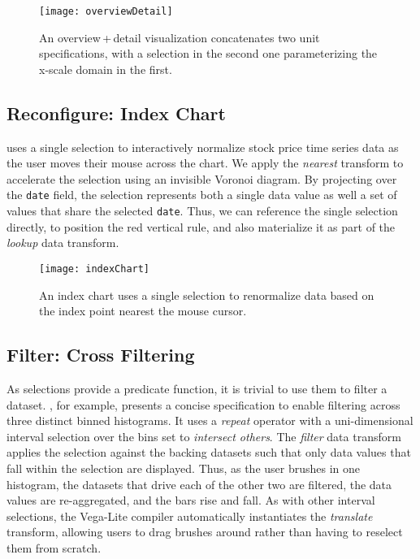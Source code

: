 \begin{figure}[h!]
  \centering
  \texttt{[image: overviewDetail]}
  \caption{An overview\,+\,detail visualization concatenates two unit
  specifications, with a selection in the second one parameterizing the x-scale
  domain in the first.}
  \label{fig:vl:overviewDetail}
\end{figure}

\clearpage
\subsection{Reconfigure: Index Chart}

\vspace{-7pt}

 uses a single selection to interactively normalize
stock price time series data as the user moves their mouse across the chart. We
apply the \emph{nearest} transform to accelerate the selection using an
invisible Voronoi diagram. By projecting over the \texttt{date} field, the
selection represents both a single data value as well a set of values that share
the selected \texttt{date}. Thus, we can reference the single selection
directly, to position the red vertical rule, and also materialize it as part of
the \emph{lookup} data transform.

\begin{figure}[h!]
  \centering
  \texttt{[image: indexChart]}
  \caption{An index chart uses a single selection to renormalize data based
  on the index point nearest the mouse cursor.}
  \label{fig:vl:indexChart}
\end{figure}

\subsection{Filter: Cross Filtering}

As selections provide a predicate function, it is trivial to use them to filter
a dataset. , for example, presents a concise
specification to enable filtering across three distinct binned histograms. It
uses a \emph{repeat} operator with a uni-dimensional interval selection over the
bins set to \emph{intersect others}. The \emph{filter} data transform applies
the selection against the backing datasets such that only data values that fall
within the selection are displayed. Thus, as the user brushes in one histogram,
the datasets that drive each of the other two are filtered, the data values are
re-aggregated, and the bars rise and fall. As with other interval selections,
the Vega-Lite compiler automatically instantiates the \emph{translate}
transform, allowing users to drag brushes around rather than having to reselect
them from scratch.

